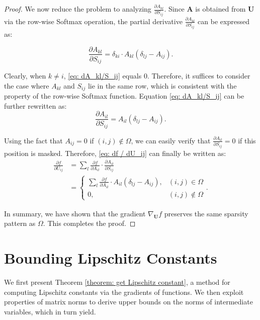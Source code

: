 \documentclass[lettersize,onecolumn]{IEEEtran}
\begin{document}
\begin{proof}
We now reduce the problem to analyzing $\frac{\partial A_{k l}}{\partial S_{i j}}$. Since $\mathbf{A}$ is obtained from $\mathbf{U}$ via the row-wise Softmax operation, the partial derivative $\frac{\partial A_{k l}}{\partial S_{i j}}$ can be expressed as:

\begin{equation}
    \frac{\partial A_{k l}}{\partial S_{i j}}=\delta_{k i} \cdot A_{k l}\left(\delta_{l j}-A_{i j}\right).
    \label{eq: dA_kl/S_ij}
\end{equation}

Clearly, when $k \neq i$, \eqref{eq: dA_kl/S_ij} equals 0. Therefore, it suffices to consider the case where $A_{k l}$ and $S_{i j}$ lie in the same row, which is consistent with the property of the row-wise Softmax function. Equation \eqref{eq: dA_kl/S_ij} can be further rewritten as:
\begin{equation}
    \frac{\partial A_{i l}}{\partial S_{i j}}= A_{i l}\left(\delta_{l j}-A_{i j}\right).
\end{equation}

Using the fact that $A_{i j}=0$ if $(i,j)\notin \Omega$, we can easily verify that $\frac{\partial A_{i l}}{\partial S_{i j}}=0$ if this position is masked. Therefore, \eqref{eq: df / dU_ij} can finally be written as:
\begin{equation}
    \begin{aligned}
        \frac{\partial f}{\partial U_{i j}} &= \sum_{l}\frac{\partial f}{\partial A_{il}} \cdot \frac{\partial A_{i l}}{\partial S_{i j}} \\
        &= \begin{cases}
            \sum_{l} \frac{\partial f}{\partial A_{il}}\cdot A_{i l}\left(\delta_{l j}-A_{i j}\right), & (i,j) \in \Omega \\
            0, & (i,j) \notin \Omega
        \end{cases}.
    \end{aligned}
\end{equation}

In summary, we have shown that the gradient $\nabla_{\mathbf{U}}f$ preserves the same sparsity pattern as $\Omega$. This completes the proof.

\end{proof}

\section{Bounding Lipschitz Constants}\label{appendix: bounding Lips constants}
We first present Theorem \ref{theorem: get Lipschitz constant}, a method for computing Lipschitz constants via the gradients of functions. We then exploit properties of matrix norms to derive upper bounds on the norms of intermediate variables, which in turn yield.
\end{document}
